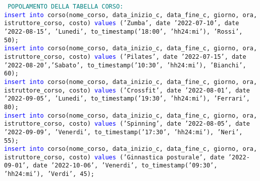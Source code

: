 \documentclass{article}
\begin{document}
    \begin{flushleft}
        \texttt{
        \textcolor{teal}{POPOLAMENTO DELLA TABELLA CORSO:} \\
        \hspace*{0.5em}\textcolor{blue}{insert into} corso(nome\_corso, data\_inizio\_c, data\_fine\_c, giorno, ora, \hspace*{0.0em} istruttore\_corso, costo) \textcolor{blue}{values} ('Zumba', date '2022-07-10', date '2022-08-15', \hspace*{0.4em}'Lunedi', to\_timestamp('18:00', 'hh24:mi'), 'Rossi', 50); \\
        \vspace{2mm}
        \hspace*{0.5em}\textcolor{blue}{insert into} corso(nome\_corso, data\_inizio\_c, data\_fine\_c, giorno, ora, \hspace*{0.0em} istruttore\_corso, costo) \textcolor{blue}{values} ('Pilates', date '2022-07-15', date  \hspace*{0.4em}'2022-08-20','Sabato', to\_timestamp('10:30', 'hh24:mi'), 'Bianchi', 60); \\
        \vspace{2mm}
        \hspace*{0.5em}\textcolor{blue}{insert into} corso(nome\_corso, data\_inizio\_c, data\_fine\_c, giorno, ora, \hspace*{0.0em} istruttore\_corso, costo) \textcolor{blue}{values} ('Crossfit', date '2022-08-01', date \hspace*{0.4em}'2022-09-05', 'Lunedi', to\_timestamp('19:30', 'hh24:mi'), 'Ferrari', 80); \\
        \vspace{2mm}
        \hspace*{0.5em}\textcolor{blue}{insert into} corso(nome\_corso, data\_inizio\_c, data\_fine\_c, giorno, ora, \hspace*{0.0em} istruttore\_corso, costo) \textcolor{blue}{values} ('Spinning', date '2022-08-05', date \hspace*{0.4em}'2022-09-09', 'Venerdi', to\_timestamp('17:30', 'hh24:mi'), 'Neri', 55); \\
        \vspace{2mm}
        \hspace*{0.5em}\textcolor{blue}{insert into} corso(nome\_corso, data\_inizio\_c, data\_fine\_c, giorno, ora, \hspace*{0.0em} istruttore\_corso, costo) \textcolor{blue}{values} ('Ginnastica posturale', date '2022-09-01', date \hspace*{0.4em}'2022-10-06', 'Venerdi', to\_timestamp('09:30', 'hh24:mi'), 'Verdi', 45); \\
}
\end{flushleft}
\end{document}
